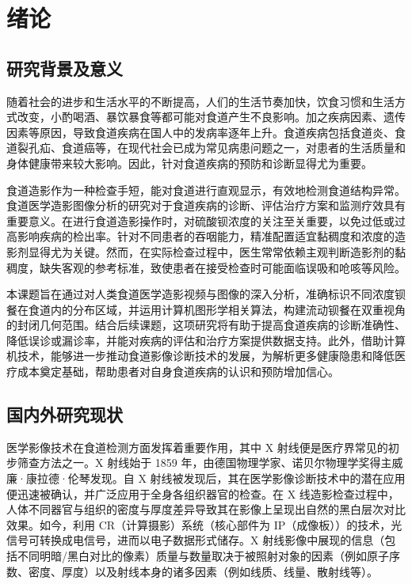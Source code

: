 \section{绪论}\label{sec:1}

\subsection{研究背景及意义}

随着社会的进步和生活水平的不断提高，人们的生活节奏加快，饮食习惯和生活方式改变，小酌喝酒、暴饮暴食等都可能对食道产生不良影响。加之疾病因素、遗传因素等原因，导致食道疾病在国人中的发病率逐年上升。食道疾病包括食道炎、食道裂孔疝、食道癌等，在现代社会已成为常见病患问题之一，对患者的生活质量和身体健康带来较大影响。因此，针对食道疾病的预防和诊断显得尤为重要。

食道造影作为一种检查手短，能对食道进行直观显示，有效地检测食道结构异常。食道医学造影图像分析的研究对于食道疾病的诊断、评估治疗方案和监测疗效具有重要意义。在进行食道造影操作时，对硫酸钡浓度的关注至关重要，以免过低或过高影响疾病的检出率。针对不同患者的吞咽能力，精准配置适宜黏稠度和浓度的造影剂显得尤为关键。然而，在实际检查过程中，医生常常依赖主观判断造影剂的黏稠度，缺失客观的参考标准，致使患者在接受检查时可能面临误吸和呛咳等风险。

本课题旨在通过对人类食道医学造影视频与图像的深入分析，准确标识不同浓度钡餐在食道内的分布区域，并运用计算机图形学相关算法，构建流动钡餐在双重视角的封闭几何范围。结合后续课题，这项研究将有助于提高食道疾病的诊断准确性、降低误诊或漏诊率，并能对疾病的评估和治疗方案提供数据支持。此外，借助计算机技术，能够进一步推动食道影像诊断技术的发展，为解析更多健康隐患和降低医疗成本奠定基础，帮助患者对自身食道疾病的认识和预防增加信心。

\subsection{国内外研究现状}

医学影像技术在食道检测方面发挥着重要作用，其中 X 射线便是医疗界常见的初步筛查方法之一。X 射线始于 1859 年，由德国物理学家、诺贝尔物理学奖得主威廉·康拉德·伦琴发现\cite{johansen1996circumstances}。自 X 射线被发现后，其在医学影像诊断技术中的潜在应用便迅速被确认，并广泛应用于全身各组织器官的检查。在 X 线造影检查过程中，人体不同器官与组织的密度与厚度差异导致其在影像上呈现出自然的黑白层次对比效果。如今，利用 CR（计算摄影）系统（核心部件为 IP（成像板））的技术，光信号可转换成电信号，进而以电子数据形式储存。X 射线影像中展现的信息（包括不同明暗/黑白对比的像素）质量与数量取决于被照射对象的因素（例如原子序数、密度、厚度）以及射线本身的诸多因素（例如线质、线量、散射线等）。

